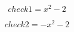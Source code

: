 \documentclass[letterpaper, 10pt]{extarticle}
\begin{document}
\begin{dmath*}
check1 =
    x^{2} - 2
\end{dmath*}


\begin{dmath*}
check2 =
    - x^{2} - 2
\end{dmath*}
\end{document}
